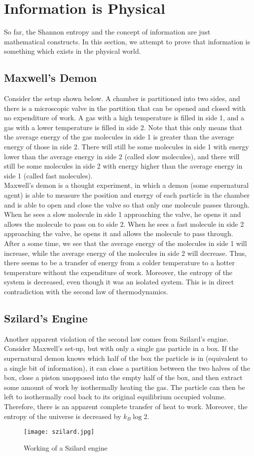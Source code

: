 \documentclass[letterpaper,10pt,english]{article}
\begin{document}
{\section{Information is Physical}
So far, the Shannon entropy and the concept of information are just mathematical constructs. In this section, we attempt to prove that information is something which exists in the physical world. 
\subsection{Maxwell's Demon}
Consider the setup shown below. A chamber is partitioned into two sides, and there is a microscopic valve in the partition that can be opened and closed with no expenditure of work. A gas with a high temperature is filled in side 1, and a gas with a lower temperature is filled in side 2. Note that this only means that the average energy of the gas molecules in side 1 is greater than the average energy of those in side 2. There will still be some molecules in side 1 with energy lower than the average energy in side 2 (called slow molecules), and there will still be some molecules in side 2 with energy higher than the average energy in side 1 (called fast molecules). \\
Maxwell's demon is a thought experiment, in which a demon (some supernatural agent) is able to measure the position and energy of each particle in the chamber and is able to open and close the valve so that only one molecule passes through. When he sees a slow molecule in side 1 approaching the valve, he opens it and allows the molecule to pass on to side 2. When he sees a fast molecule in side 2 approaching the valve, he opens it and allows the molecule to pass through. \\
After a some time, we see that the average energy of the molecules in side 1 will increase, while the average energy of the molecules in side 2 will decrease. Thus, there seems to be a transfer of energy from a colder temperature to a hotter temperature without the expenditure of work.  Moreover, the entropy of the system is decreased, even though it was an isolated system. This is in direct contradiction with the second law of thermodynamics. 
\subsection{Szilard's Engine}
Another apparent violation of the second law comes from Szilard's engine. Consider Maxwell's set-up, but with only a single gas particle in a box. If the supernatural demon knows which half of the box the particle is in (equivalent to a single bit of information), it can close a partition between the two halves of the box, close a piston unopposed into the empty half of the box, and then extract some amount of work by isothermally heating the gas. The particle can then be left to isothermally cool back to its original equilibrium occupied volume. Therefore, there is an apparent complete transfer of heat to work. Moreover, the entropy of the universe is decreased by $k_B \log 2$. 
\begin{figure}[h]
\texttt{[image: szilard.jpg]}
\caption {Working of a Szilard engine}
\end{figure}
}
\end{document}
